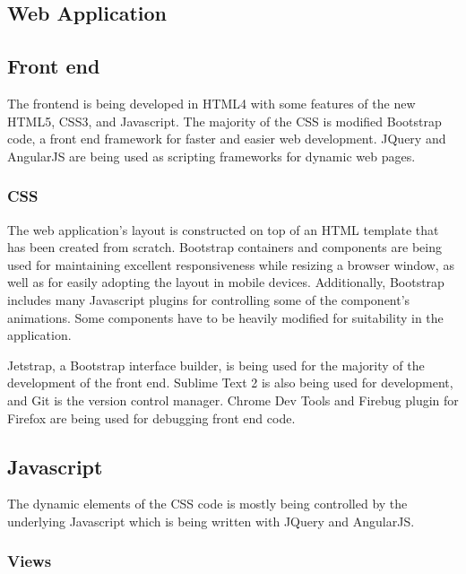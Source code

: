 
\subsection{Web Application}

\subsection{Front end}

The frontend is being developed in HTML4 with some features of the new HTML5,
CSS3, and Javascript. The majority of the CSS is modified Bootstrap code, a
front end framework for faster and easier web development. JQuery and AngularJS
are being used as scripting frameworks for dynamic web pages.

\subsubsection{CSS}

The web application's layout is constructed on top of an HTML template that has
been created from scratch. Bootstrap containers and components are being used
for maintaining excellent responsiveness while resizing a browser window, as
well as for easily adopting the layout in mobile devices. Additionally,
Bootstrap includes many Javascript plugins for controlling some of the
component's animations. Some components have to be heavily modified for
suitability in the application.

Jetstrap, a Bootstrap interface builder, is being used for the majority of the
development of the front end. Sublime Text 2 is also being used for
development, and Git is the version control manager. Chrome Dev Tools and
Firebug plugin for Firefox are being used for debugging front end code.

\subsection{Javascript}

The dynamic elements of the CSS code is mostly being controlled by the
underlying Javascript which is being written with JQuery and AngularJS.

\subsubsection{Views}

